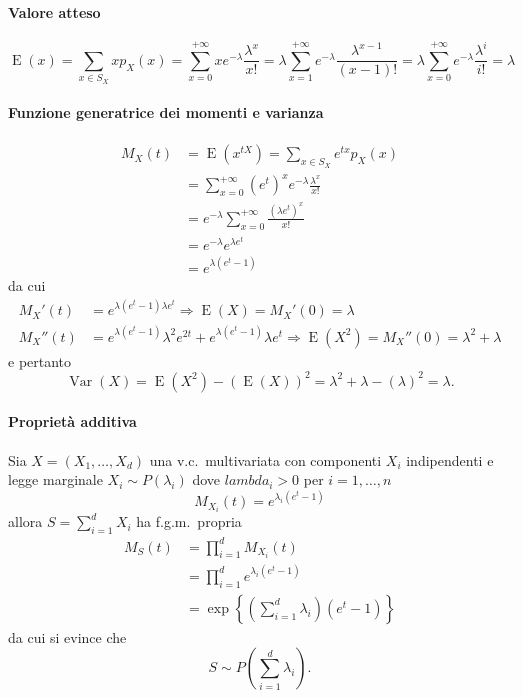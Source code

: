 \documentclass[11pt,a4paper,twoside]{article}
\newcommand\smallsum{\textstyle\sum}
\DeclareMathOperator{\Var}{Var}
\DeclareMathOperator{\E}{E}
\begin{document}
\paragraph{Valore atteso}
\[
  \E(x) = \sum_{x\in S_X} xp_X(x) = \sum_{x=0}^{+\infty} x
  e^{-\lambda} \frac{\lambda^x}{x!} = \lambda\sum_{x=1}^{+\infty}
  e^{-\lambda} \frac{\lambda^{x-1}}{(x-1)!} = \lambda
  \sum_{x=0}^{+\infty} e^{-\lambda} \frac{\lambda^i}{i!} = \lambda
\]

\paragraph{Funzione generatrice dei momenti e varianza}
\begin{align*}
  M_X(t)
  &= \E(x^{t X}) = \sum_{x\in S_X} e^{tx} p_X(x) \\
  &= \sum_{x=0}^{+\infty} \left( e^t \right)^x e^{-\lambda}\frac{\lambda^x}{x!} \\
  &= e^{-\lambda} \sum_{x=0}^{+\infty} \frac{\left( \lambda e^t\right)^x}{x!} \\
  &= e^{-\lambda} e^{\lambda e^t} \\
  &= e^{\lambda (e^t -1)}
\end{align*}
da cui
\begin{align*}
  M_X'(t) &= e^{\lambda (e^t -1) \lambda e^t} \Longrightarrow \E(X) =
            M_X'(0) = \lambda \\
  M_X''(t) &= e^{\lambda (e^t -1)} \lambda^2 e^{2t} + e^{\lambda (e^t
             -1)}\lambda e^t \Longrightarrow \E(X^2) = M_X''(0) =
             \lambda^2 + \lambda
\end{align*}
e pertanto
\[
  \Var(X) = \E(X^2) - (\E(X))^2 = \lambda^2 + \lambda - (\lambda)^2 = \lambda.
\]

\paragraph{Proprietà additiva}
Sia \(X = (X_1, \dots, X_d)\) una v.c.\ multivariata con componenti
\(X_i\) indipendenti e legge marginale \(X_i \sim P(\lambda_i)\) dove
\(lambda_i > 0\) per \(i = 1, \dots, n\)
\[
  M_{X_i}(t) = e^{\lambda_i (e^t -1)}
\]
allora \(S = \sum_{i=1}^d X_i\) ha f.g.m.\ propria
\begin{align*}
  M_S(t)
  &= \prod_{i=1}^d M_{X_i}(t) \\
  &= \prod_{i=1}^d e^{\lambda_i (e^t -1)} \\
  &= \exp \left\{ \left( \sum_{i=1}^d \lambda_i \right) (e^t-1) \right\}
\end{align*}
da cui si evince che
\[
  S \sim P\left( \smallsum_{i=1}^d \lambda_i \right) .
\]
\end{document}
